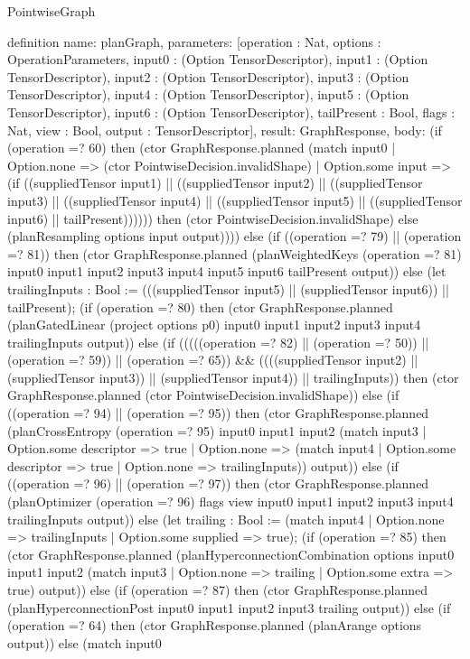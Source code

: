\begin{lexlean}{PointwiseGraph}
\begin{semanticmodule}
definition{
  name: planGraph,
  parameters: [operation : Nat, options : OperationParameters, input0 : (Option TensorDescriptor), input1 : (Option TensorDescriptor), input2 : (Option TensorDescriptor), input3 : (Option TensorDescriptor), input4 : (Option TensorDescriptor), input5 : (Option TensorDescriptor), input6 : (Option TensorDescriptor), tailPresent : Bool, flags : Nat, view : Bool, output : TensorDescriptor],
  result: GraphResponse,
  body: (if (operation =? 60) then (ctor GraphResponse.planned (match input0 | Option.none => (ctor PointwiseDecision.invalidShape) | Option.some input => (if ((suppliedTensor input1) || ((suppliedTensor input2) || ((suppliedTensor input3) || ((suppliedTensor input4) || ((suppliedTensor input5) || ((suppliedTensor input6) || tailPresent)))))) then (ctor PointwiseDecision.invalidShape) else (planResampling options input output)))) else (if ((operation =? 79) || (operation =? 81)) then (ctor GraphResponse.planned (planWeightedKeys (operation =? 81) input0 input1 input2 input3 input4 input5 input6 tailPresent output)) else (let trailingInputs : Bool := (((suppliedTensor input5) || (suppliedTensor input6)) || tailPresent); (if (operation =? 80) then (ctor GraphResponse.planned (planGatedLinear (project options p0) input0 input1 input2 input3 input4 trailingInputs output)) else (if (((((operation =? 82) || (operation =? 50)) || (operation =? 59)) || (operation =? 65)) && ((((suppliedTensor input2) || (suppliedTensor input3)) || (suppliedTensor input4)) || trailingInputs)) then (ctor GraphResponse.planned (ctor PointwiseDecision.invalidShape)) else (if ((operation =? 94) || (operation =? 95)) then (ctor GraphResponse.planned (planCrossEntropy (operation =? 95) input0 input1 input2 (match input3
      | Option.some descriptor => true
      | Option.none => (match input4
        | Option.some descriptor => true
        | Option.none => trailingInputs)) output)) else (if ((operation =? 96) || (operation =? 97)) then (ctor GraphResponse.planned (planOptimizer (operation =? 96) flags view input0 input1 input2 input3 input4 trailingInputs output)) else (let trailing : Bool := (match input4
      | Option.none => trailingInputs
      | Option.some supplied => true); (if (operation =? 85) then (ctor GraphResponse.planned (planHyperconnectionCombination options input0 input1 input2 (match input3
      | Option.none => trailing
      | Option.some extra => true) output)) else (if (operation =? 87) then (ctor GraphResponse.planned (planHyperconnectionPost input0 input1 input2 input3 trailing output)) else (if (operation =? 64) then (ctor GraphResponse.planned (planArange options output)) else (match input0
}
\end{semanticmodule}
\end{lexlean}
